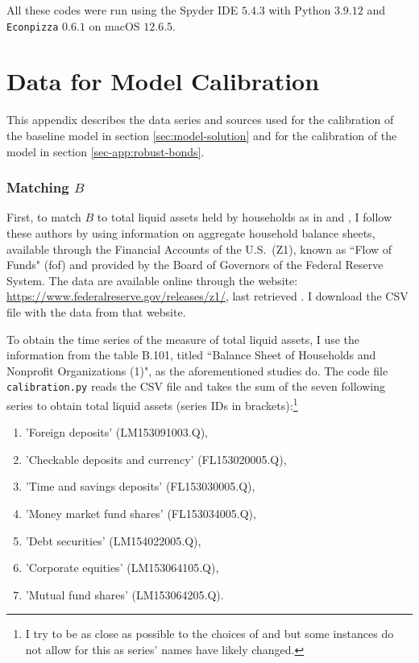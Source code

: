 \documentclass[a4paper,12pt]{article} %
\numberwithin{equation}{section} %
\numberwithin{figure}{section}
\numberwithin{table}{section}
\begin{document}
\begin{refsection}
\begin{appendices}
\bigskip

All these codes were run using the Spyder IDE $5.4.3$ with Python $3.9.12$ and \texttt{Econpizza} $0.6.1$ on macOS $12.6.5$. 

\section{Data for Model Calibration}
\label{sec-app:data}

This appendix describes the data series and sources used for the calibration of the baseline model in section \ref{sec:model-solution} and for the calibration of the model in section \ref{sec-app:robust-bonds}.

\subsubsection*{Matching $B$}

First, to match $B$ to total liquid assets held by households as in \textcite{mckay2016} and \textcite{gl2017}, I follow these authors by using information on aggregate household balance sheets, available through the Financial Accounts of the U.S.~(Z1), known as ``Flow of Funds" (\Gls{fof}) and provided by the Board of Governors of the Federal Reserve System. The data are available online through the website: \url{https://www.federalreserve.gov/releases/z1/}, last retrieved . I download the CSV file with the data from that website.

To obtain the time series of the measure of total liquid assets, I use the information from the table B.101, titled ``Balance Sheet of Households and Nonprofit Organizations (1)", as the aforementioned studies do. The code file \texttt{calibration.py} reads the CSV file and takes the sum of the seven following series to obtain total liquid assets (series IDs in brackets):\footnote{I try to be as close as possible to the choices of \textcite{mckay2016} and \textcite{gl2017} but some instances do not allow for this as series' names have likely changed.}
\begin{enumerate}
    \item 'Foreign deposits' (LM153091003.Q),
    \item 'Checkable deposits and currency' (FL153020005.Q),
    \item 'Time and savings deposits' (FL153030005.Q),
    \item 'Money market fund shares' (FL153034005.Q),
    \item 'Debt securities' (LM154022005.Q),
    \item 'Corporate equities' (LM153064105.Q),
    \item 'Mutual fund shares' (LM153064205.Q).
\end{enumerate}


\end{appendices}
\end{refsection}
\end{document}
